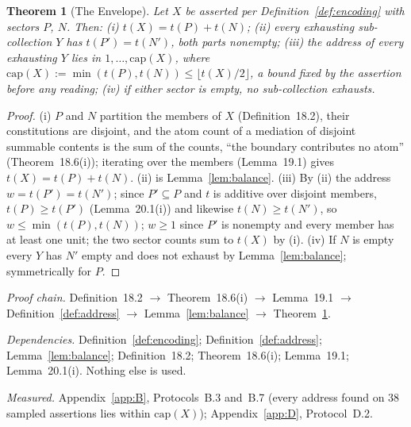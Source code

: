 \documentclass[pdflatex,sn-mathphys-num]{sn-jnl}
\theoremstyle{thmstyleone}%
\newtheorem{theorem}{Theorem}[section]
\theoremstyle{thmstyletwo}%
\theoremstyle{thmstylethree}%
\newtheorem{theorem}{Theorem}[section]
\newcommand{\q}[1]{``#1''}        %
\newcommand{\deps}[1]{\par\begin{sloppypar}\noindent\emph{Dependencies.} #1 Nothing else is used.\end{sloppypar}}
\newcommand{\chain}[1]{\par\begin{sloppypar}\noindent\emph{Proof chain.} #1\end{sloppypar}}
\newcommand{\measured}[1]{\par\begin{sloppypar}\noindent\emph{Measured.} #1\end{sloppypar}}
\begin{document}
\begin{theorem}[The Envelope]\label{thm:envelope}
Let $X$ be asserted per Definition~\ref{def:encoding} with sectors $P$, $N$. Then: (i) $t(X)=t(P)+t(N)$; (ii) every exhausting sub-collection $Y$ has $t(P')=t(N')$, both parts nonempty; (iii) the address of every exhausting $Y$ lies in $1,\dots,\mathrm{cap}(X)$, where $\mathrm{cap}(X):=\min(t(P),t(N))\le\lfloor t(X)/2\rfloor$, a bound fixed by the assertion before any reading; (iv) if either sector is empty, no sub-collection exhausts.
\end{theorem}
\begin{proof}
(i) $P$ and $N$ partition the members of $X$ (Definition~18.2), their constitutions are disjoint, and the atom count of a mediation of disjoint summable contents is the sum of the counts, \q{the boundary contributes no atom} (Theorem~18.6(i)); iterating over the members (Lemma~19.1) gives $t(X)=t(P)+t(N)$. (ii) is Lemma~\ref{lem:balance}. (iii) By (ii) the address $w=t(P')=t(N')$; since $P'\subseteq P$ and $t$ is additive over disjoint members, $t(P)\ge t(P')$ (Lemma~20.1(i)) and likewise $t(N)\ge t(N')$, so $w\le\min(t(P),t(N))$; $w\ge1$ since $P'$ is nonempty and every member has at least one unit; the two sector counts sum to $t(X)$ by (i). (iv) If $N$ is empty every $Y$ has $N'$ empty and does not exhaust by Lemma~\ref{lem:balance}; symmetrically for $P$.
\end{proof}
\chain{Definition~18.2 $\to$ Theorem~18.6(i) $\to$ Lemma~19.1 $\to$ Definition~\ref{def:address} $\to$ Lemma~\ref{lem:balance} $\to$ Theorem~\ref{thm:envelope}.}
\deps{Definition~\ref{def:encoding}; Definition~\ref{def:address}; Lemma~\ref{lem:balance}; Definition~18.2; Theorem~18.6(i); Lemma~19.1; Lemma~20.1(i).}
\measured{Appendix~\ref{app:B}, Protocols~B.3 and~B.7 (every address found on 38 sampled assertions lies within $\mathrm{cap}(X)$); Appendix~\ref{app:D}, Protocol~D.2.}
\end{document}
